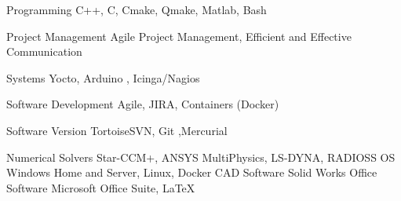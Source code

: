 

\begin{cvskills}

  \cvskill
    {Programming} %
    {C++, C, Cmake, Qmake, Matlab, Bash
} %

  \cvskill
    {Project Management} %
    {Agile Project Management, Efficient and Effective Communication
} %

  \cvskill
    {Systems} %
    {Yocto, Arduino , Icinga/Nagios } %

  \cvskill
    {Software Development} %
    {Agile, JIRA, Containers (Docker)} %
    
  \cvskill
    {Software Version} %
    {TortoiseSVN, Git ,Mercurial} %

  \cvskill
    {Numerical Solvers} %
    { Star-CCM+, ANSYS MultiPhysics, LS-DYNA, RADIOSS} %
  \cvskill
    {OS} %
    {Windows Home and Server, Linux, Docker } %
  \cvskill
    {CAD Software} %
    {Solid Works} %
  \cvskill
    {Office Software} %
    {Microsoft Office Suite, LaTeX} %

\end{cvskills}
